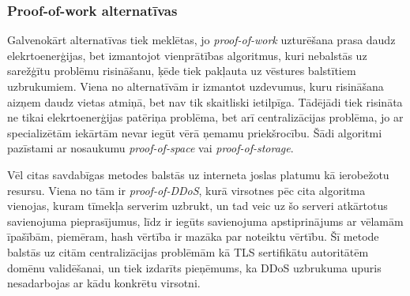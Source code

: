 \subsubsection{Proof-of-work alternatīvas}
Galvenokārt alternatīvas tiek meklētas, jo \textit{proof-of-work} uzturēšana prasa daudz elekrtoenerģijas, bet izmantojot vienprātības algoritmus, kuri nebalstās uz sarežģītu problēmu risināšanu, ķēde tiek pakļauta uz vēstures balstītiem uzbrukumiem. Viena no alternatīvām ir izmantot uzdevumus, kuru risināšana aizņem daudz vietas atmiņā, bet nav tik skaitliski ietilpīga.\cite{dziembowski15} Tādējādi tiek risināta ne tikai elekrtoenerģijas patēriņa problēma, bet arī centralizācijas problēma, jo ar specializētām iekārtām nevar iegūt vērā ņemamu priekšrocību. Šādi algoritmi pazīstami ar nosaukumu \textit{proof-of-space} vai \textit{proof-of-storage}.

Vēl citas savdabīgas metodes balstās uz interneta joslas platumu kā ierobežotu resursu. Viena no tām ir \textit{proof-of-DDoS}, kurā virsotnes pēc cita algoritma vienojas, kuram tīmekļa serverim uzbrukt, un tad veic uz šo serveri atkārtotus savienojuma pieprasījumus, līdz ir iegūts savienojuma apstiprinājums ar vēlamām īpašībām, piemēram, hash vērtība ir mazāka par noteiktu vērtību. Šī metode balstās uz citām centralizācijas problēmām kā TLS sertifikātu autoritātēm domēnu validēšanai, un tiek izdarīts pieņēmums, ka DDoS uzbrukuma upuris nesadarbojas ar kādu konkrētu virsotni.\cite{wustrow16}


